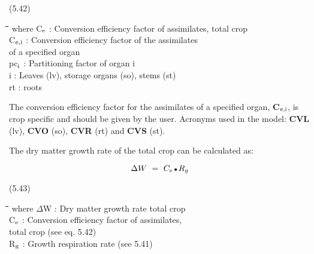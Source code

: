 \documentclass[11pt]{article}
\begin{document}
\bigskip
\bigskip
\bigskip
\bigskip
\strut\hfill (5.42)\nwln
\begin{tabbing}
\hspace{1.27cm}\=\hspace{1.27cm}\=\hspace{1.27cm}\=\hspace{1.27cm}\=%
\hspace{1.27cm}\=\hspace{1.27cm}\=\hspace{1.27cm}\=\hspace{1.27cm}\=%
\hspace{1.27cm}\=\hspace{1.27cm}\=\kill
where\> C$_{{\rm e}}$\> : Conversion efficiency factor of assimilates, total crop\> \> \> \> \> \> \> \> [kg kg$^{{\rm -1}}$]\\
\>C$_{{\rm e,i}}$\> : Conversion efficiency factor of the assimilates \\
\>\>   of a specified organ\> \> \> \> \> \> \> \> [kg kg$^{{\rm -1}}$]\\
\>pc$_{{\rm i}}$\> : Partitioning factor of organ i\> \> \> \> \> \> \> \> [kg kg$^{{\rm -1}}$]\\
\>i\> : Leaves (lv), storage organs (so), stems (st)\\
\>rt\> : roots
\end{tabbing}

\bigskip
\bigskip
The conversion efficiency factor for the assimilates of a specified organ, {\bf C$_{{\rm e,i}}$}, is crop
specific and should be given by the user. Acronyms used in the model: {\bf CVL} (lv), {\bf CVO}
(so), {\bf CVR} (rt) and {\bf CVS} (st).

\bigskip
\bigskip
The dry matter growth rate of the total crop can be calculated as:

\begin{displaymath}
\Delta W~=~ C _{e} \, {\rm \Bullet{0.75ex}}\, R _{g} 
\end{displaymath}

 \bigskip
\strut\hfill (5.43)
\nwln
\begin{tabbing}
\hspace{1.27cm}\=\hspace{1.27cm}\=\hspace{1.27cm}\=\hspace{1.27cm}\=%
\hspace{1.27cm}\=\hspace{1.27cm}\=\hspace{1.27cm}\=\hspace{1.27cm}\=%
\hspace{1.27cm}\=\hspace{1.27cm}\=\kill
where\> $\Delta$W\> : Dry matter growth rate total crop\> \> \> \> \> \> \> \> [kg ha$^{{\rm -1}}$ d$^{{\rm -1}}$]\\
\>C$_{{\rm e}}$\> : Conversion efficiency factor of assimilates, \\
\>\>   total crop (see eq. 5.42)\> \> \> \> \> \> \> \> [kg kg$^{{\rm -1}}$] \\
\>R$_{{\rm g}}$\> : Growth respiration rate (see 5.41)\> \> \> \> \> \> \> \> [kg ha$^{{\rm -1}}$ d$^{{\rm -1}}$]
\end{tabbing}
\end{document}
